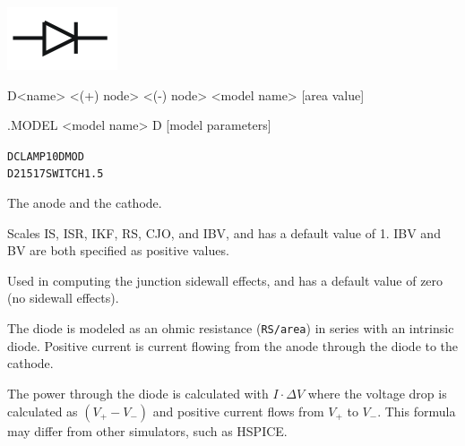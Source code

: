


\begin{Device}\label{D_DEVICE}

\symbol
{\includegraphics{diodeSymbol}}

\device
D<name> <(+) node> <(-) node> <model name> [area value]

\model
.MODEL <model name> D [model parameters]

\examples
\begin{alltt}
  DCLAMP 1 0 DMOD
  D2 15 17 SWITCH 1.5
\end{alltt}

\parameters
\begin{Parameters}


The anode and the cathode.


Scales IS, ISR, IKF, RS, CJO, and IBV, and has a default value of 1.
IBV and BV are both specified as positive values.


Used in computing the junction sidewall effects, and has a default
value of zero (no sidewall effects).

\end{Parameters}

\comments

The diode is modeled as an ohmic resistance (\texttt{RS/area}) in series
with an intrinsic diode.  Positive current is current flowing from the
anode through the diode to the cathode. 

The power through the diode is calculated 
with $I \cdot \Delta V$ where the voltage drop is calculated as $(V_+ - V_-)$ 
and positive current flows from $V_+$ to $V_-$.  This formula may differ from
other simulators, such as HSPICE.

\end{Device}

